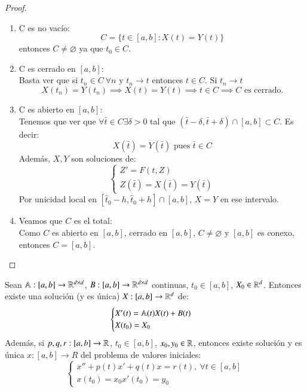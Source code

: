 \begin{proof}
\begin{enumerate}
\begin{enumerate}
        \item C es no vacío:
        $$C = \{t\in [a, b] : X(t) = Y(t)\}$$ entonces $C \neq \varnothing$ ya que $t_0\in C$.
        \item C es cerrado en $[a, b]$:\\
        Basta ver que si $t_n \in C\ \forall n$ y $t_n \to t$ entonces $t \in C$. Si $t_n \to t$
        $$
            X(t_n) = Y(t_n) \implies X(t) = Y(t) \implies t \in C \implies C \text{ es cerrado.}
        $$
        \item C es abierto en $[a, b]$:\\
        Tenemos que ver que $\forall \bar{t}\in C \exists \delta > 0$ tal que $(\bar{t} - \delta, \bar{t} + \delta) \cap [a, b] \subset C$. Es decir:
        $$
            X(\bar{t}) = Y(\bar{t}) \text{ pues }\bar{t} \in C
        $$
        Además, $X, Y$ son soluciones de:
        $$
        \begin{cases}
            Z' = F(t, Z)\\
            Z(\bar{t}) = X(\bar{t}) = Y(\bar{t})
        \end{cases}
        $$
        Por unicidad local en $[\hat{t}_0 - h, \hat{t}_0 + h] \cap[a, b]$, $X=Y$ en ese intervalo.
        \item Veamos que $C$ es el total:\\
        Como $C$ es abierto en $[a,b]$, cerrado en $[a, b]$,  $C \neq \varnothing$ y $[a, b]$ es conexo, entonces $C = [a, b]$.
        \end{enumerate}
    \end{enumerate}

\end{proof}
\begin{cor}
    Sean $\mathbb{A} : [a, b]\to \mathbb{R}^{d\times d}$, $B : [a, b]\to\mathbb{R}^{d\times d}$ continuas, $t_0 \in [a, b]$, $X_0 \in \mathbb{R}^d$. Entonces existe una solución (y es única) $X : [a, b] \to \mathbb{R}^d$ de:
    $$
        \begin{cases}
            X'(t) = \mathbb{A}(t) X(t) + B(t)\\
            X(t_0) = X_0
        \end{cases}
    $$ %
    Además, si $p, q, r :[a, b] \to \mathbb{R}$, $t_0 \in [a, b]$, $x_0, y_0 \in \mathbb{R}$, entonces existe solución y es única $x : [a, b] \to R$ del problema de valores iniciales:
    $$
        \begin{cases}
            x'' + p(t) x' + q(t) x = r(t),\ \forall t \in [a,b]\\
            x(t_0) = x_0
            x'(t_0) = y_0
        \end{cases}
    $$
\end{cor}
